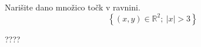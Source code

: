 \documentclass[addpoints]{exam}
\begin{document}
\begin{questions}
\begin{parts}

    \end{parts}
    
    


    





            

                        

                

    
    \question[3]
    Narišite dano množico točk v ravnini.
        $$\left\{(x,y)\in\mathbb{R}^2;~\lvert x\rvert >3\right\}$$

            \begin{solution}[2cm]
                ????
            \end{solution}




\end{questions}
\end{document}
